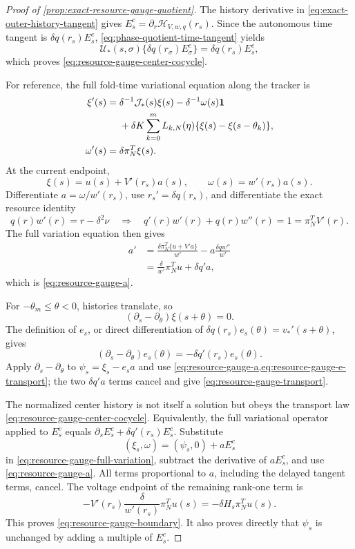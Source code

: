 \begin{proof}[Proof of \cref{prop:exact-resource-gauge-quotient}]
The history derivative in
\cref{eq:exact-outer-history-tangent} gives
\(E_s^c=\partial_r\mathcal H_{V,w,q}(r_s)\).  Since the autonomous
time tangent is \(\delta q(r_s)E_s^c\),
\cref{eq:phase-quotient-time-tangent} yields
\[
 \mathcal U_*(s,\sigma)\{\delta q(r_\sigma)E_\sigma^c\}
 =\delta q(r_s)E_s^c,
\]
which proves \cref{eq:resource-gauge-center-cocycle}.

For reference, the full fold-time variational equation along the tracker is
\begin{align}
 \xi'(s)={}&\delta^{-1}\mathcal J_*(s)\xi(s)
 -\delta^{-1}\omega(s)\mathbf1\notag\\
 &+\delta K\sum_{k=0}^mL_{k,N}(\eta)
       \{\xi(s)-\xi(s-\theta_k)\},\notag\\
 \omega'(s)={}&\delta\pi_N^T\xi(s).                 \label{eq:resource-gauge-full-variation}
\end{align}
At the current endpoint,
\[
 \xi(s)=u(s)+V'(r_s)a(s),\qquad
 \omega(s)=w'(r_s)a(s).
\]
Differentiate \(a=\omega/w'(r_s)\), use \(r_s'=\delta q(r_s)\), and
differentiate the exact resource identity
\[
 q(r)w'(r)=r-\delta^2\nu
 \quad\Longrightarrow\quad
 q'(r)w'(r)+q(r)w''(r)=1=\pi_N^TV'(r).
\]
The full variation equation then gives
\begin{align*}
 a'
 &=\frac{\delta\pi_N^T\{u+V'a\}}{w'}
   -a\frac{\delta q w''}{w'}\\
 &=\frac{\delta}{w'}\pi_N^Tu+\delta q'a,
\end{align*}
which is \cref{eq:resource-gauge-a}.

For \(-\theta_m\le\theta<0\), histories translate, so
\[
 (\partial_s-\partial_\theta)\xi(s+\theta)=0.
\]
The definition of \(e_s\), or direct differentiation of
\(\delta q(r_s)e_s(\theta)=v_*'(s+\theta)\), gives
\begin{equation}
 (\partial_s-\partial_\theta)e_s(\theta)
 =-\delta q'(r_s)e_s(\theta).                       \label{eq:resource-gauge-e-transport}
\end{equation}
Apply \(\partial_s-\partial_\theta\) to
\(\psi_s=\xi_s-e_sa\) and use
\cref{eq:resource-gauge-a,eq:resource-gauge-e-transport}; the two
\(\delta q'a\) terms cancel and give
\cref{eq:resource-gauge-transport}.

The normalized center history is not itself a solution but obeys the
transport law \cref{eq:resource-gauge-center-cocycle}.  Equivalently, the
full variational operator applied to \(E_s^c\) equals
\(\partial_sE_s^c+\delta q'(r_s)E_s^c\).  Substitute
\[
 (\xi_s,\omega)
 =(\psi_s,0)+aE_s^c
\]
in \cref{eq:resource-gauge-full-variation}, subtract the derivative of
\(aE_s^c\), and use \cref{eq:resource-gauge-a}.  All terms proportional to
\(a\), including the delayed tangent terms, cancel.  The voltage endpoint
of the remaining rank-one term is
\[
 -V'(r_s)\frac{\delta}{w'(r_s)}\pi_N^Tu(s)
 =-\delta H_s\pi_N^Tu(s).
\]
This proves \cref{eq:resource-gauge-boundary}.  It also proves directly that
\(\psi_s\) is unchanged by adding a multiple of \(E_s^c\).


\end{proof}

